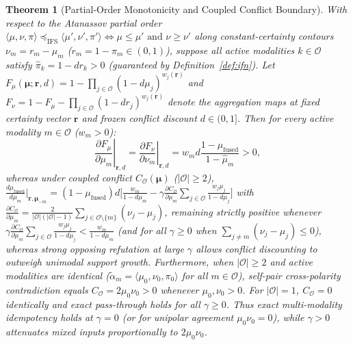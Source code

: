 \documentclass[10pt,twocolumn]{article}
\newtheorem{theorem}{Theorem}
\begin{document}
\begin{theorem}[Partial-Order Monotonicity and Coupled Conflict Boundary]
\label{thm:monotonicity}
With respect to the Atanassov partial order $\langle \mu, \nu, \pi\rangle \preceq_{\text{IFS}}
\langle \mu', \nu', \pi'\rangle \iff \mu \le \mu' \text{ and } \nu \ge \nu'$ along
constant-certainty contours $\nu_m = r_m - \mu_m$ ($r_m = 1 - \pi_m \in (0, 1)$), suppose all
active modalities $k \in \mathcal{O}$ satisfy $\hat{\pi}_k = 1 - d r_k > 0$ (guaranteed by
Definition~\ref{def:ifn}). Let $F_\mu(\bm{\mu}; \bm{r}, d) = 1 - \prod_{j\in\mathcal{O}}(1 -
d\mu_j)^{w_j(\bm{r})}$ and $F_\nu = 1 - F_\mu - \prod_{j\in\mathcal{O}}(1 - d
r_j)^{w_j(\bm{r})}$ denote the aggregation maps at fixed certainty vector $\bm{r}$ and frozen
conflict discount $d \in (0, 1]$. Then for every active modality $m \in \mathcal{O}$ ($w_m >
0$):
\begin{equation}
\left.\frac{\partial F_\mu}{\partial \mu_m}\right|_{\bm{r}, d} = \left.\frac{\partial
F_\nu}{\partial \nu_m}\right|_{\bm{r}, d} = w_m d \frac{1 - \mu_{\text{fused}}}{1 -
\hat{\mu}_m} > 0,
\end{equation}
whereas under coupled conflict $C_{\mathcal{O}}(\bm{\mu})$ ($|\mathcal{O}|\ge 2$),
$\frac{d\mu_{\text{fused}}}{d\mu_m}\big|_{\bm{r},\bm{\mu}_{-m}} =
(1-\mu_{\text{fused}})d\big[\frac{w_m}{1-d\mu_m} - \gamma\frac{\partial
C_{\mathcal{O}}}{\partial \mu_m}\sum_{j\in\mathcal{O}}\frac{w_j\mu_j}{1-d\mu_j}\big]$ with
$\frac{\partial C_{\mathcal{O}}}{\partial \mu_m} =
\frac{2}{|\mathcal{O}|(|\mathcal{O}|-1)}\sum_{j\in\mathcal{O}\setminus\{m\}}(\nu_j - \mu_j)$,
remaining strictly positive whenever $\gamma\frac{\partial C_{\mathcal{O}}}{\partial
\mu_m}\sum_{j\in\mathcal{O}}\frac{w_j\mu_j}{1-d\mu_j} < \frac{w_m}{1-d\mu_m}$ (and for all
$\gamma\ge 0$ when $\sum_{j\neq m}(\nu_j-\mu_j)\le 0$), whereas strong opposing refutation at
large $\gamma$ allows conflict discounting to outweigh unimodal support growth. Furthermore,
when $|\mathcal{O}|\ge 2$ and active modalities are identical ($\tilde{\alpha}_m =
\langle \mu_0, \nu_0, \pi_0\rangle$ for all $m\in\mathcal{O}$), self-pair cross-polarity
contradiction equals $C_{\mathcal{O}} = 2\mu_0\nu_0 > 0$ whenever $\mu_0,\nu_0 > 0$.
For $|\mathcal{O}|=1$, $C_{\mathcal{O}}=0$ identically and exact pass-through holds for all
$\gamma\ge0$. Thus exact multi-modality idempotency holds at $\gamma=0$ (or for unipolar
agreement $\mu_0\nu_0=0$), while $\gamma > 0$ attenuates mixed inputs proportionally to
$2\mu_0\nu_0$.
\end{theorem}
\end{document}

